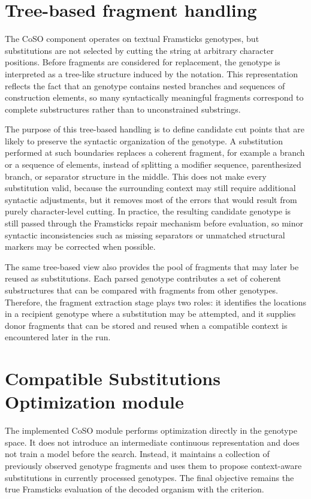 \section{Tree-based fragment handling}

The CoSO component operates on textual Framsticks \fone{} genotypes, but substitutions are not selected by cutting the string at arbitrary character positions. Before fragments are considered for replacement, the genotype is interpreted as a tree-like structure induced by the \fone{} notation. This representation reflects the fact that an \fone{} genotype contains nested branches and sequences of construction elements, so many syntactically meaningful fragments correspond to complete substructures rather than to unconstrained substrings.

The purpose of this tree-based handling is to define candidate cut points that are likely to preserve the syntactic organization of the genotype. A substitution performed at such boundaries replaces a coherent fragment, for example a branch or a sequence of elements, instead of splitting a modifier sequence, parenthesized branch, or separator structure in the middle. This does not make every substitution valid, because the surrounding context may still require additional syntactic adjustments, but it removes most of the errors that would result from purely character-level cutting. In practice, the resulting candidate genotype is still passed through the Framsticks repair mechanism before evaluation, so minor syntactic inconsistencies such as missing separators or unmatched structural markers may be corrected when possible.

The same tree-based view also provides the pool of fragments that may later be reused as substitutions. Each parsed genotype contributes a set of coherent substructures that can be compared with fragments from other genotypes. Therefore, the fragment extraction stage plays two roles: it identifies the locations in a recipient genotype where a substitution may be attempted, and it supplies donor fragments that can be stored and reused when a compatible context is encountered later in the run.

\section{Compatible Substitutions Optimization module}

The implemented CoSO module performs optimization directly in the \fone{} genotype space. It does not introduce an intermediate continuous representation and does not train a model before the search. Instead, it maintains a collection of previously observed genotype fragments and uses them to propose context-aware substitutions in currently processed genotypes. The final objective remains the true Framsticks evaluation of the decoded organism with the \vertpos{} criterion.

